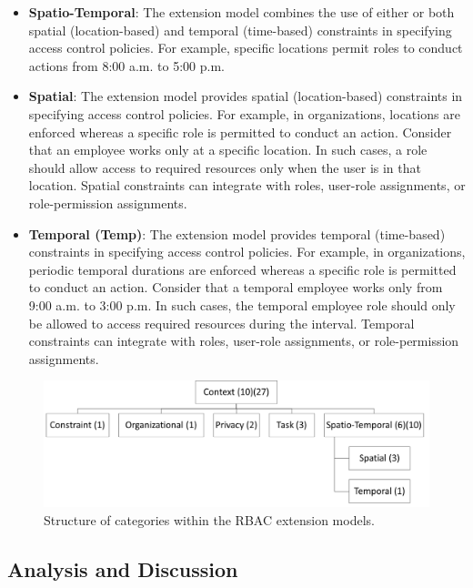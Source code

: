 \begin{itemize}
  \item \textbf{Spatio-Temporal}: The extension model combines the use of either or both spatial (location-based) and temporal (time-based) constraints in specifying access control policies. For example, specific locations permit roles to conduct actions from 8:00 a.m. to 5:00 p.m.

  \item \textbf{Spatial}: The extension model provides spatial (location-based) constraints in specifying access
	control policies. For example, in organizations, locations are enforced whereas a
	specific role is permitted to conduct an action. Consider that an employee works only at a specific location.
	In such cases, a role should allow access to required resources only when the user is in that location. 
	Spatial constraints can integrate with roles, user-role assignments, or role-permission assignments. 

  \item \textbf{Temporal (Temp)}:  The extension model provides temporal (time-based) constraints in specifying access
	control policies. For example, in organizations, periodic temporal durations are enforced whereas a
	specific role is permitted to conduct an action. Consider that a temporal employee works only from 9:00 a.m. to 3:00 p.m.
	In such cases, the temporal employee role should only be allowed to access required resources during the interval. 
	Temporal constraints can integrate with roles, user-role assignments, or role-permission assignments.   
	
\end{itemize}

\begin{figure}[ht]
    \centering
        \includegraphics[width=6.0in]{sections/category_structrure.png}
    \caption{\label{fig:category_structrure}Structure of categories within the RBAC extension models.}
\end{figure}

\subsection{Analysis and Discussion}

